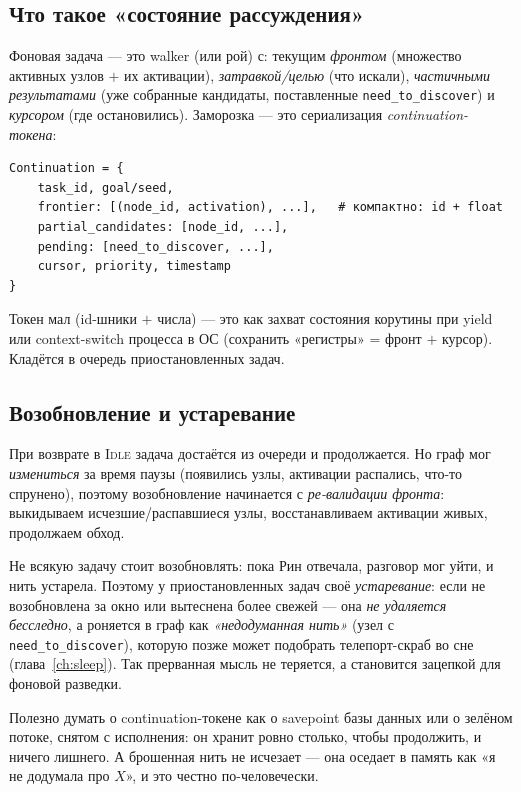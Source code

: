 \subsection{Что такое «состояние рассуждения»}

Фоновая задача — это walker (или рой) с: текущим \emph{фронтом} (множество активных
узлов $+$ их активации), \emph{затравкой/целью} (что искали), \emph{частичными
результатами} (уже собранные кандидаты, поставленные \texttt{need\_to\_discover}) и
\emph{курсором} (где остановились). Заморозка — это сериализация \emph{continuation-
токена}:

\begin{lstlisting}[style=pseudo]
Continuation = {
    task_id, goal/seed,
    frontier: [(node_id, activation), ...],   # компактно: id + float
    partial_candidates: [node_id, ...],
    pending: [need_to_discover, ...],
    cursor, priority, timestamp
}
\end{lstlisting}

Токен мал (id-шники $+$ числа) — это как захват состояния корутины при yield или
context-switch процесса в ОС (сохранить «регистры» = фронт $+$ курсор). Кладётся в
очередь приостановленных задач.

\subsection{Возобновление и устаревание}

При возврате в \textsc{Idle} задача достаётся из очереди и продолжается. Но граф мог
\emph{измениться} за время паузы (появились узлы, активации распались, что-то
спрунено), поэтому возобновление начинается с \emph{ре-валидации фронта}: выкидываем
исчезшие/распавшиеся узлы, восстанавливаем активации живых, продолжаем обход.

Не всякую задачу стоит возобновлять: пока Рин отвечала, разговор мог уйти, и нить
устарела. Поэтому у приостановленных задач своё \emph{устаревание}: если не
возобновлена за окно или вытеснена более свежей — она \emph{не удаляется бесследно}, а
роняется в граф как \emph{«недодуманная нить»} (узел с \texttt{need\_to\_discover}),
которую позже может подобрать телепорт-скраб во сне (глава~\ref{ch:sleep}). Так
прерванная мысль не теряется, а становится зацепкой для фоновой разведки.

\begin{intuition}
Полезно думать о continuation-токене как о savepoint базы данных или о зелёном
потоке, снятом с исполнения: он хранит ровно столько, чтобы продолжить, и ничего
лишнего. А брошенная нить не исчезает — она оседает в память как «я не додумала про
$X$», и это честно по-человечески.
\end{intuition}

